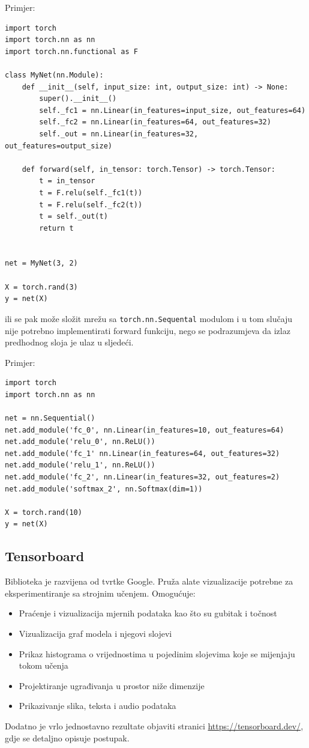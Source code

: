 Primjer:
\begin{lstlisting}
import torch
import torch.nn as nn
import torch.nn.functional as F

class MyNet(nn.Module):
	def __init__(self, input_size: int, output_size: int) -> None:
		super().__init__()
		self._fc1 = nn.Linear(in_features=input_size, out_features=64)
		self._fc2 = nn.Linear(in_features=64, out_features=32)
		self._out = nn.Linear(in_features=32, out_features=output_size)
		
	def forward(self, in_tensor: torch.Tensor) -> torch.Tensor:
		t = in_tensor
		t = F.relu(self._fc1(t))
		t = F.relu(self._fc2(t))
		t = self._out(t)
		return t


net = MyNet(3, 2)

X = torch.rand(3)
y = net(X)
\end{lstlisting}

ili se pak može složit mrežu sa \lstinline$torch.nn.Sequental$ modulom i u tom slučaju nije potrebno implementirati forward funkciju, nego se podrazumjeva da izlaz predhodnog sloja je ulaz u sljedeći. 

Primjer:

\begin{lstlisting}
import torch
import torch.nn as nn

net = nn.Sequential()
net.add_module('fc_0', nn.Linear(in_features=10, out_features=64)
net.add_module('relu_0', nn.ReLU())
net.add_module('fc_1' nn.Linear(in_features=64, out_features=32)
net.add_module('relu_1', nn.ReLU())
net.add_module('fc_2', nn.Linear(in_features=32, out_features=2)
net.add_module('softmax_2', nn.Softmax(dim=1))

X = torch.rand(10)
y = net(X)
\end{lstlisting}

\subsection{Tensorboard}
Biblioteka je razvijena od tvrtke Google. Pruža alate vizualizacije potrebne za eksperimentiranje sa strojnim učenjem. 
Omogućuje:
\begin{itemize}
	\item Praćenje i vizualizacija mjernih podataka kao što su gubitak i točnost
	\item Vizualizacija graf modela i njegovi slojevi
	\item Prikaz histograma o vrijednostima u pojedinim slojevima koje se mijenjaju tokom učenja
	\item Projektiranje ugrađivanja u prostor niže dimenzije
	\item Prikazivanje slika, teksta i audio podataka
\end{itemize}
Dodatno je vrlo jednostavno rezultate objaviti stranici \url{https://tensorboard.dev/}, gdje se detaljno opisuje postupak.

